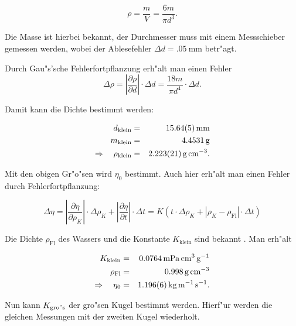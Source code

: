		\begin{equation*}
			\rho = \frac{m}{V} = \frac{6 m}{\pi d^3} .
		\end{equation*}

		Die Masse ist hierbei bekannt, der Durchmesser muss mit einem Messschieber gemessen werden, wobei der Ablesefehler $\Delta d = \SI{.05}{\milli \meter}$ betr"agt.

		Durch Gau"s'sche Fehlerfortpflanzung erh"alt man einen Fehler 
		\begin{equation*}
			\Delta \rho = \left| \frac{\partial \rho}{\partial d} \right| \cdot \Delta d = \frac{18m}{\pi d^4} \cdot \Delta d .
		\end{equation*}

		Damit kann die Dichte bestimmt werden:

		\begin{eqnarray*}
			d_\mathrm{klein} & = & \SI{15.64 (5)}{\milli \meter} \\ 
			m_\mathrm{klein} & = & \SI{4.4531}{\gram} \\
			\Rightarrow \quad \rho_\mathrm{klein} & = & \SI{2.223 (21)}{\gram \per \centi \meter \cubed} .
		\end{eqnarray*}

		Mit den obigen Gr"o"sen wird $\eta_0$ bestimmt.
		Auch hier erh"alt man einen Fehler durch Fehlerfortpflanzung:

		\begin{equation*}
			\Delta \eta = \left| \frac{\partial \eta}{\partial \rho_K} \right| \cdot \Delta \rho_K + \left| \frac{\partial \eta}{\partial t} \right| \cdot \Delta t = K \left(t \cdot \Delta \rho_K + \left|\rho_K - \rho_\mathrm{Fl}\right| \cdot \Delta t \right)
		\end{equation*}

		Die Dichte $\rho_\mathrm{Fl}$ des Wassers und die Konstante $K_\mathrm{klein}$ sind bekannt \cite{uni_magdeburg} \cite{anleitung} . Man erh"alt

		\begin{eqnarray*}
			K_\mathrm{klein} & = & \SI{.0764}{\milli \pascal \centi \meter \cubed \per \gram} \\
			\rho_\mathrm{Fl} & = & \SI{.998}{\gram \per \centi \meter \cubed}\\
			\Rightarrow \quad \eta_0 & = & \SI{1.196 (6)}{\kilo \gram \per \meter \per \second} .
		\end{eqnarray*}

		Nun kann $K_\mathrm{gro"s}$ der gro"sen Kugel bestimmt werden.
		Hierf"ur werden die gleichen Messungen mit der zweiten Kugel wiederholt.

